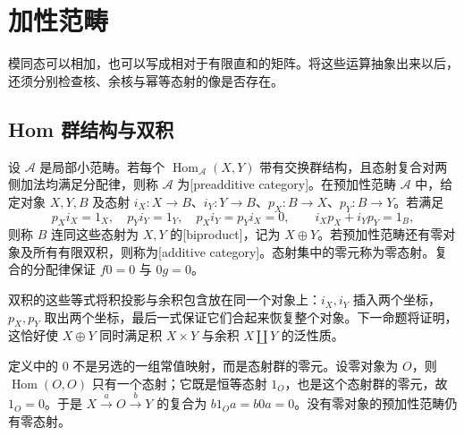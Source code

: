 
\section{加性范畴}
\label{b4:sec:0401}

模同态可以相加，也可以写成相对于有限直和的矩阵。将这些运算抽象出来以后，还须分别检查核、余核与幂等态射的像是否存在。

%
%

\subsection{Hom 群结构与双积}
\label{b4:subsec:0401:01}

\begin{definition}\label{b4:def:additive-category}
	设 \(\mathcal A\) 是局部小范畴。若每个 \(\operatorname{Hom}_{\mathcal A}(X,Y)\) 带有交换群结构，且态射复合对两侧加法均满足分配律，则称 \(\mathcal A\) 为[preadditive category]。在预加性范畴 \(\mathcal A\) 中，给定对象 \(X,Y,B\) 及态射 \(i_X:X\to B\)、\(i_Y:Y\to B\)、\(p_X:B\to X\)、\(p_Y:B\to Y\)。若满足
	\[
		p_Xi_X=1_X,\quad p_Yi_Y=1_Y,\quad p_Xi_Y=p_Yi_X=0, \qquad i_Xp_X+i_Yp_Y=1_B,
	\]
	则称 \(B\) 连同这些态射为 \(X,Y\) 的[biproduct]，记为 \(X\oplus Y\)。若预加性范畴还有零对象及所有有限双积，则称为[additive category]。态射集中的零元称为零态射。复合的分配律保证 \(f0=0\) 与 \(0g=0\)。
\end{definition}

双积的这些等式将积投影与余积包含放在同一个对象上：\(i_X,i_Y\) 插入两个坐标，\(p_X,p_Y\) 取出两个坐标，最后一式保证它们合起来恢复整个对象。下一命题将证明，这恰好使 \(X\oplus Y\) 同时满足积 \(X\times Y\) 与余积 \(X\amalg Y\) 的泛性质。

\ProseParagraphBreak
定义中的 \(0\) 不是另选的一组常值映射，而是态射群的零元。设零对象为 \(O\)，则 \(\operatorname{Hom}(O,O)\) 只有一个态射；它既是恒等态射 \(1_O\)，也是这个态射群的零元，故 \(1_O=0\)。于是 \(X\xrightarrow aO\xrightarrow bY\) 的复合为 \(b1_Oa=b0a=0\)。没有零对象的预加性范畴仍有零态射。

